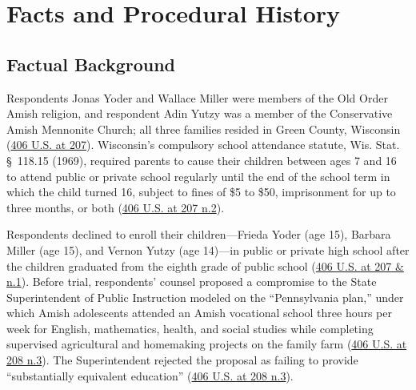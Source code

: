 \documentclass[12pt]{article}
\begin{document}
\section{Facts and Procedural History}

\subsection{Factual Background}

Respondents Jonas Yoder and Wallace Miller were members of the Old Order Amish religion, and respondent Adin Yutzy was a member of the Conservative Amish Mennonite Church; all three families resided in Green County, Wisconsin (\href{https://supreme.justia.com/cases/federal/us/406/205/}{406 U.S. at 207}). Wisconsin's compulsory school attendance statute, Wis. Stat. \S~118.15 (1969), required parents to cause their children between ages 7 and 16 to attend public or private school regularly until the end of the school term in which the child turned 16, subject to fines of \$5 to \$50, imprisonment for up to three months, or both (\href{https://supreme.justia.com/cases/federal/us/406/205/}{406 U.S. at 207 n.2}).

Respondents declined to enroll their children---Frieda Yoder (age 15), Barbara Miller (age 15), and Vernon Yutzy (age 14)---in public or private high school after the children graduated from the eighth grade of public school (\href{https://supreme.justia.com/cases/federal/us/406/205/}{406 U.S. at 207 \& n.1}). Before trial, respondents' counsel proposed a compromise to the State Superintendent of Public Instruction modeled on the ``Pennsylvania plan,'' under which Amish adolescents attended an Amish vocational school three hours per week for English, mathematics, health, and social studies while completing supervised agricultural and homemaking projects on the family farm (\href{https://supreme.justia.com/cases/federal/us/406/205/}{406 U.S. at 208 n.3}). The Superintendent rejected the proposal as failing to provide ``substantially equivalent education'' (\href{https://supreme.justia.com/cases/federal/us/406/205/}{406 U.S. at 208 n.3}).
\end{document}
